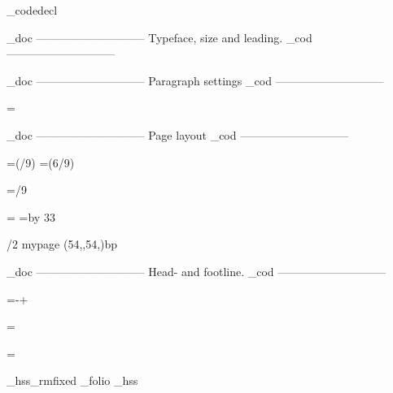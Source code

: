 \_codedecl 

    \_doc -----------------------------
    Typeface, size and leading.
    \_cod -----------------------------

\fontfam[ebgaramond]
\typosize[11/14]

    \_doc -----------------------------
    Paragraph settings
    \_cod -----------------------------

\parskip=0pt
\parindent=\baselineskip


    \_doc -----------------------------
    Page layout
    \_cod -----------------------------



\newdimen\pagewidth     \pagewidth=6in
\newdimen\spinemargin   \spinemargin=\dimexpr(\pagewidth/9)\relax
\newdimen\measure       \measure=\dimexpr(6\pagewidth/9)

\newdimen\pageheight    \pageheight=9in 
\newdimen\depth         \depth=6in     
\newdimen\topmargin     \topmargin=/9\relax
                        \baselineskip
                        \baselineskip

%

\hsize=\measure
\vsize=\topskip \advance\vsize by 33\baselineskip %

\margins/2 mypage (54,,54,)bp

    \_doc -----------------------------
    Head- and footline.
    \_cod -----------------------------

\headlinedist=\dimexpr\baselineskip-\topskip+\baselineskip\relax

\newif\ifheadline \headlinetrue

\headline = {
    \ifheadline
        \ifodd \pageno
            \noindent{}\hss%
        \else
            \hss{\setff{+smcp}\_rmfixed The Man who was Thursday}\hss%
        \fi
    \else
        \global\headlinetrue
    \fi
}

\baselineskip

\newif\iffootline \footlinetrue

\footline={%
    \iffootline
        \ifodd\pageno
            \_hss\_rmfixed \_folio \_hss%
        \else
            \_hss\setff{+onum}\_rmfixed \_folio \_hss%
        \fi
    \else
        \global\footlinetrue
    \fi
}



